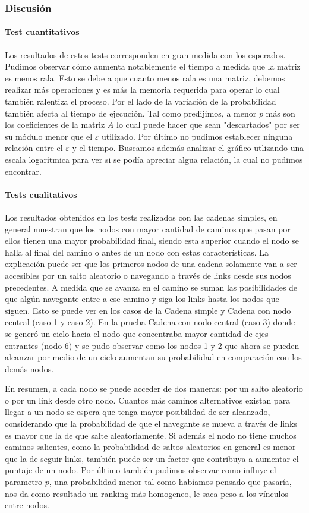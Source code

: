 \subsubsection*{Discusión}
\paragraph{Test cuantitativos}
Los resultados de estos tests corresponden en gran medida con los esperados. Pudimos observar c\'omo aumenta notablemente el tiempo
a medida que la matriz es menos rala. Esto se debe a que cuanto menos rala es una matriz, debemos realizar m\'as operaciones y es m\'as la
memoria requerida para operar lo cual también ralentiza el proceso.\newline
Por el lado de la variaci\'on de la probabilidad también afecta al tiempo de ejecuci\'on. Tal como predijimos, a menor $p$ m\'as son
los coeficientes de la matriz $A$ lo cual puede hacer que sean "descartados" por ser su m\'odulo menor que el $\varepsilon$ utilizado.\newline
Por \'ultimo no pudimos establecer ninguna relaci\'on entre el $\varepsilon$ y el tiempo. Buscamos además
analizar el gr\'afico utlizando una escala logar\'itmica para ver si se pod\'ia apreciar algua relaci\'on, la cual no pudimos encontrar.
\paragraph{Tests cualitativos}
Los resultados obtenidos en los tests realizados con las cadenas simples, en general muestran que los nodos con mayor cantidad de caminos que pasan por ellos tienen una mayor probabilidad final, siendo esta superior cuando el nodo se halla al final del camino o antes de un nodo con estas características. La explicación puede ser que los primeros nodos de una cadena solamente van a ser accesibles por un salto aleatorio o navegando a través de links desde sus nodos precedentes. A medida que se avanza en el camino se suman las posibilidades de que algún navegante entre a ese camino y siga los links hasta los nodos que siguen. Esto se puede ver en los casos de la Cadena simple y Cadena con nodo central (caso 1 y caso 2). En la prueba Cadena con nodo central (caso 3) donde se generó un ciclo hacia el nodo que concentraba mayor cantidad de ejes entrantes (nodo 6) y se pudo observar como los nodos 1 y 2 que ahora se pueden alcanzar por medio de un ciclo aumentan su probabilidad en comparación con los demás nodos.


En resumen, a cada nodo se puede acceder de dos maneras: por un salto aleatorio o por un link desde otro nodo. Cuantos más caminos alternativos existan para llegar a un nodo se espera que tenga mayor posibilidad de ser alcanzado, considerando que la probabilidad de que el navegante se mueva a través de links es mayor que la de que salte aleatoriamente. Si además el nodo no tiene muchos caminos salientes, como la probabilidad de saltos aleatorios en general es menor que la de seguir links, también puede ser un factor que contribuya a aumentar el puntaje de un nodo.
Por \'ultimo tambi\'en pudimos observar como influye el parametro $p$, una probabilidad menor tal como hab\'iamos pensado que pasar\'ia, nos da como resultado un ranking m\'as homogeneo, le saca peso a los v\'inculos entre nodos.